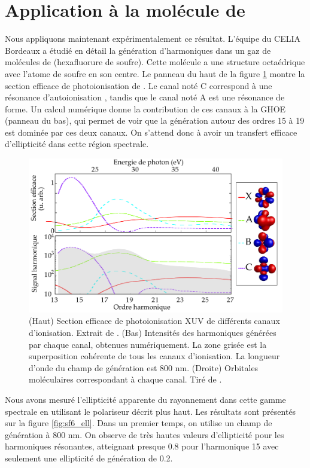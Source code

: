 \section{Application à la molécule de }
\label{sec:sf6ghoe}
Nous appliquons maintenant expérimentalement ce résultat. L'équipe du CELIA Bordeaux a étudié en détail la génération d'harmoniques dans un gaz de molécules de  (hexafluorure de soufre). Cette molécule a une structure octaédrique avec l'atome de soufre en son centre. Le panneau du haut de la figure \ref{fig:sf6_cross_section} montre la section efficace de photoionisation de . Le canal noté C correspond à une résonance d'autoionisation , tandis que le canal noté A est une résonance de forme. Un calcul numérique donne la contribution de ces canaux à la GHOE (panneau du bas), qui permet de voir que la génération autour des ordres 15 à 19 est dominée par ces deux canaux. On s'attend donc à avoir un transfert efficace d'ellipticité dans cette région spectrale.

\begin{figure}[!ht]
\centering
\includegraphics[width=.8\columnwidth]{Figures/SF6/sf6_cross_section.png}%
\caption{(Haut) Section efficace de photoionisation XUV de différents canaux d'ionisation. Extrait de . (Bas) Intensités des harmoniques générées par chaque canal, obtenues numériquement. La zone grisée est la superposition cohérente de tous les canaux d'ionisation. La longueur d'onde du champ de génération est 800 nm. (Droite) Orbitales moléculaires correspondant à chaque canal. Tiré de .}
\label{fig:sf6_cross_section}
\end{figure}

Nous avons mesuré l'ellipticité apparente du rayonnement dans cette gamme spectrale en utilisant le polariseur décrit plus haut. Les résultats sont présentés sur la figure \ref{fig:sf6_ell}. Dans un premier temps, on utilise un champ de génération à 800 nm. On observe de très hautes valeurs d'ellipticité pour les harmoniques résonantes, atteignant presque 0.8 pour l'harmonique 15 avec seulement une ellipticité de génération de 0.2. 

